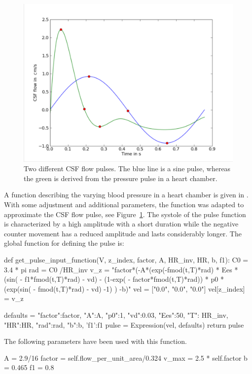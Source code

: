 \begin{figure}
  \center
  \includegraphics[width=\largefig]{chapters/hentschel/pdf/sin_pulse.pdf}
  \caption{Two different CSF flow pulses. The blue line is a sine pulse,
    whereas the green is derived from the pressure pulse in a heart
    chamber.}
  \label{fig:sin_pulse}
\end{figure}

A function describing the varying blood pressure in a heart chamber is
given in \citet{SmithChase2ShawEtAl2006}.  With some adjustment and
additional parameters, the function was adapted to approximate the CSF
flow pulse, see Figure~\ref{fig:sin_pulse}.  The systole of the pulse
function is characterized by a high amplitude with a short duration
while the negative counter movement has a reduced amplitude and lasts
considerably longer.  The global function for defining the pulse is:
\begin{python}
def get_pulse_input_function(V, z_index, factor, A, HR_inv, HR, b, f1):
        C0 = 3.4 * pi
        rad = C0 /HR_inv
        v_z = "factor*(-A*(exp(-fmod(t,T)*rad) * Ees * (sin( - f1*fmod(t,T)*rad) - vd)
              - (1-exp( - factor*fmod(t,T)*rad)) * p0 * (exp(sin( - fmod(t,T)*rad) - vd) -1) ) -b)"
        vel = ["0.0", "0.0", "0.0"]
        vel[z_index] = v_z

        defaults = {"factor":factor, "A":A, "p0":1, "vd":0.03, "Ees":50,
                    "T": HR_inv, "HR":HR, "rad":rad, "b":b, 'f1':f1}
        pulse = Expression(vel, defaults)
        return pulse
\end{python}
The following parameters have been used with this function.
\begin{python}
A = 2.9/16
factor = self.flow_per_unit_area/0.324
v_max = 2.5 * self.factor
b = 0.465
f1 = 0.8
\end{python}

